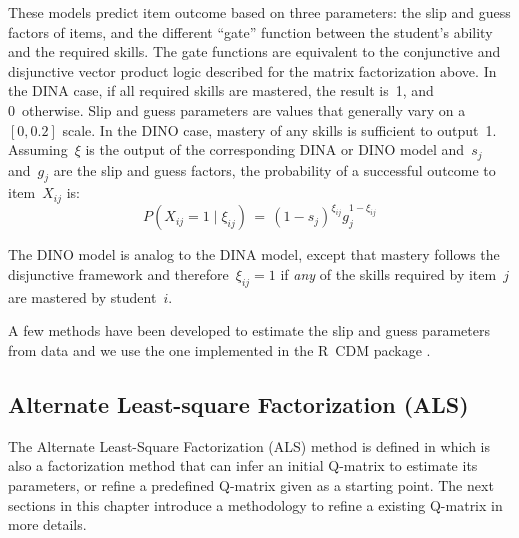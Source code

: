 These models predict item outcome based on three parameters: the slip and guess factors of items, and the different ``gate'' function between the student's ability and the required skills.  The gate functions are equivalent to the conjunctive and disjunctive vector product logic described for the matrix factorization above.  In the DINA case, if all required skills are mastered, the result is~1, and 0~otherwise. Slip and guess parameters are values that generally vary on a~$[0,0.2]$ scale. In the DINO case, mastery of any skills is sufficient to output~1.  Assuming~$\xi$ is the output of the corresponding DINA or DINO model and~$s_j$ and~$g_j$ are the slip and guess factors, the probability of a successful outcome to item~$X_{ij}$ is:
\begin{equation}
 P(X_{ij} \!=\! 1 \; | \; \xi_{ij}) \,=\, (1-s_j)^{\xi_{ij}} g_j^{1-\xi_{ij}}
\label{DinoEQ}
\end{equation}

The DINO model is analog to the DINA model, except that mastery follows the disjunctive framework and therefore~$\xi_{ij}=1$ if \textit{any} of the skills required by item~$j$ are mastered by student~$i$.

A few methods have been developed to estimate the slip and guess parameters from data and we use the one implemented in the R~CDM package \citep{Robitzsch2012}.

\subsection{Alternate Least-square Factorization (ALS)}
\label{ALS-Def}



The {Alternate Least-Square Factorization (ALS)} method is defined in \cite{Desmarais2013aied} which is also a factorization method that can infer an initial Q-matrix to estimate its parameters, or refine a predefined Q-matrix given as a starting point. The next sections in this chapter introduce a methodology to refine a existing Q-matrix in more details.


